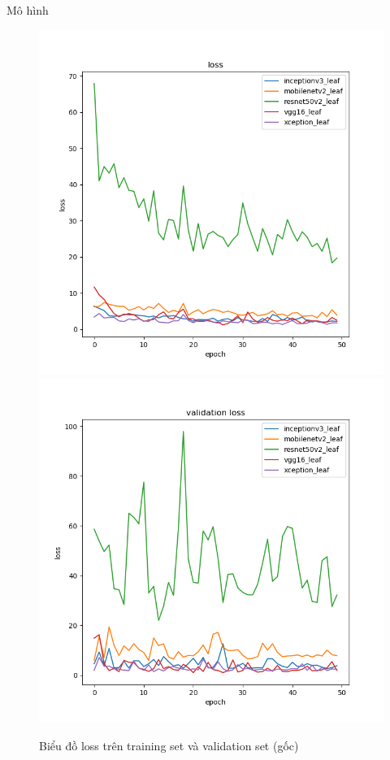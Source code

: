 \documentclass{beamer}
\begin{document}
\begin{frame}[allowframebreaks]{Mô hình}
	\framebreak

	\begin{figure}[H]
		\centering
		\includegraphics[scale=0.25]{images/leaf_loss.png}
		\includegraphics[scale=0.25]{images/leaf_val_loss.png}
		\caption{Biểu đồ loss trên training set và validation set (gốc)}
	\end{figure}
	

\end{frame}
\end{document}
